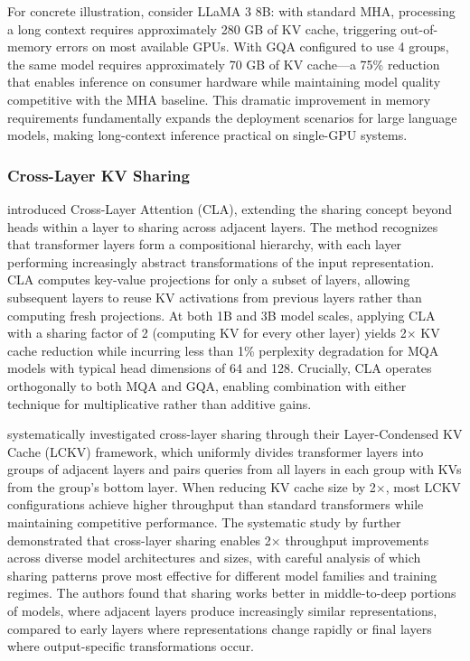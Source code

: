 \documentclass[11pt,letterpaper]{article}
\begin{document}
For concrete illustration, consider LLaMA 3 8B: with standard MHA, processing a long context requires approximately 280 GB of KV cache, triggering out-of-memory errors on most available GPUs. With GQA configured to use 4 groups, the same model requires approximately 70 GB of KV cache---a 75\% reduction that enables inference on consumer hardware while maintaining model quality competitive with the MHA baseline. This dramatic improvement in memory requirements fundamentally expands the deployment scenarios for large language models, making long-context inference practical on single-GPU systems.

\subsubsection{Cross-Layer KV Sharing}

\cite{brandon2024reducing} introduced Cross-Layer Attention (CLA), extending the sharing concept beyond heads within a layer to sharing across adjacent layers. The method recognizes that transformer layers form a compositional hierarchy, with each layer performing increasingly abstract transformations of the input representation. CLA computes key-value projections for only a subset of layers, allowing subsequent layers to reuse KV activations from previous layers rather than computing fresh projections. At both 1B and 3B model scales, applying CLA with a sharing factor of 2 (computing KV for every other layer) yields 2$\times$ KV cache reduction while incurring less than 1\% perplexity degradation for MQA models with typical head dimensions of 64 and 128. Crucially, CLA operates orthogonally to both MQA and GQA, enabling combination with either technique for multiplicative rather than additive gains.

\cite{yang2024layercondensed} systematically investigated cross-layer sharing through their Layer-Condensed KV Cache (LCKV) framework, which uniformly divides transformer layers into groups of adjacent layers and pairs queries from all layers in each group with KVs from the group's bottom layer. When reducing KV cache size by 2$\times$, most LCKV configurations achieve higher throughput than standard transformers while maintaining competitive performance. The systematic study by \cite{tu2024systematic} further demonstrated that cross-layer sharing enables 2$\times$ throughput improvements across diverse model architectures and sizes, with careful analysis of which sharing patterns prove most effective for different model families and training regimes. The authors found that sharing works better in middle-to-deep portions of models, where adjacent layers produce increasingly similar representations, compared to early layers where representations change rapidly or final layers where output-specific transformations occur.
\end{document}
